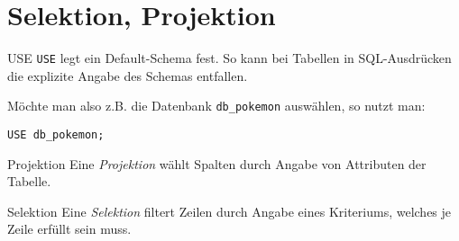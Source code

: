 \section{Selektion, Projektion}

\begin{sql}{USE}
    \texttt{USE} legt ein Default-Schema fest.
    So kann bei Tabellen in SQL-Ausdrücken die explizite Angabe des Schemas entfallen.

    Möchte man also z.B. die Datenbank \texttt{db\_pokemon} auswählen, so nutzt man:

    \begin{lstlisting}[style=SqlInputStyle]
        USE db_pokemon;
    \end{lstlisting}
\end{sql}

\begin{defi}{Projektion}
    Eine \emph{Projektion} wählt Spalten durch Angabe von Attributen der Tabelle.
\end{defi}

\begin{defi}{Selektion}
    Eine \emph{Selektion} filtert Zeilen durch Angabe eines Kriteriums, welches je Zeile erfüllt sein muss.
\end{defi}

